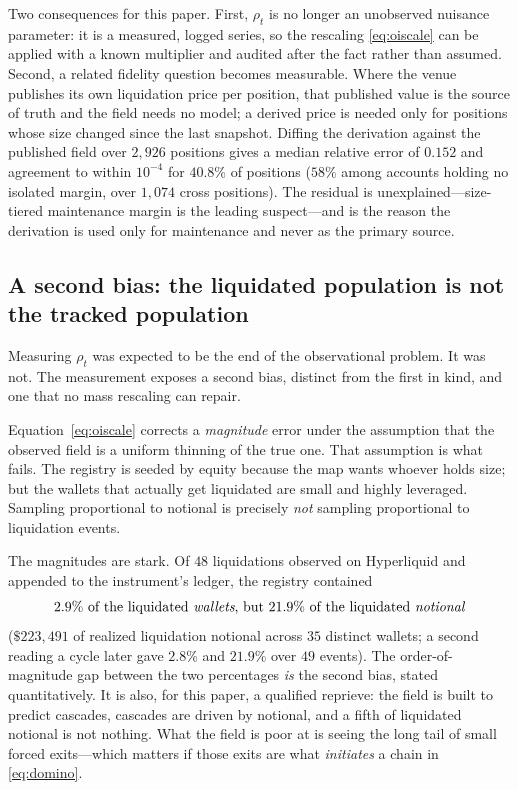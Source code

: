 \documentclass[11pt,a4paper]{article}
\theoremstyle{definition}
\theoremstyle{plain}
\begin{document}
Two consequences for this paper. First, $\rho_t$ is no longer an unobserved nuisance parameter: it
is a measured, logged series, so the rescaling \eqref{eq:oiscale} can be applied with a known
multiplier and audited after the fact rather than assumed. Second, a related fidelity question
becomes measurable. Where the venue publishes its own liquidation price per position, that published
value is the source of truth and the field needs no model; a derived price is needed only for
positions whose size changed since the last snapshot. Diffing the derivation against the published
field over $2{,}926$ positions gives a median relative error of $0.152$ and agreement to within
$10^{-4}$ for $40.8\%$ of positions ($58\%$ among accounts holding no isolated margin, over $1{,}074$
cross positions). The residual is unexplained---size-tiered maintenance margin is the leading
suspect---and is the reason the derivation is used only for maintenance and never as the primary
source.

\subsection{A second bias: the liquidated population is not the tracked population}
\label{sec:popmismatch}

Measuring $\rho_t$ was expected to be the end of the observational problem. It was not. The
measurement exposes a second bias, distinct from the first in kind, and one that no mass rescaling
can repair.

Equation~\eqref{eq:oiscale} corrects a \emph{magnitude} error under the assumption that the observed
field is a uniform thinning of the true one. That assumption is what fails. The registry is seeded by
equity because the map wants whoever holds size; but the wallets that actually get liquidated are
small and highly leveraged. Sampling proportional to notional is precisely \emph{not} sampling
proportional to liquidation events.

The magnitudes are stark. Of $48$ liquidations observed on Hyperliquid and appended to the
instrument's ledger, the registry contained
\[
  2.9\%\ \text{of the liquidated \emph{wallets}, but}\ 21.9\%\ \text{of the liquidated \emph{notional}}
\]
($\$223{,}491$ of realized liquidation notional across $35$ distinct wallets; a second reading a
cycle later gave $2.8\%$ and $21.9\%$ over $49$ events). The order-of-magnitude gap between the two
percentages \emph{is} the second bias, stated quantitatively. It is also, for this paper, a
qualified reprieve: the field is built to predict cascades, cascades are driven by notional, and a
fifth of liquidated notional is not nothing. What the field is poor at is seeing the long tail of
small forced exits---which matters if those exits are what \emph{initiates} a chain in
\eqref{eq:domino}.
\end{document}

